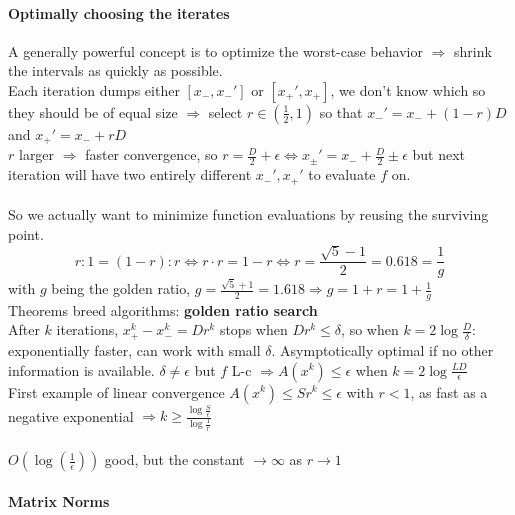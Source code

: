 \documentclass[10pt]{report}
\begin{document}
\paragraph{Optimally choosing the iterates} A generally powerful concept is to optimize the worst-case behavior $\Rightarrow$ shrink the intervals as quickly as possible.\\
Each iteration dumps either $[x_-, x_-']$ or $[x_+', x_+]$, we don't know which so they should be of equal size $\Rightarrow$ select $r\in (\frac{1}{2},1)$ so that $x_-' = x_- + (1-r)D$ and $x_+' = x_- + rD$\\
$r$ larger $\Rightarrow$ faster convergence, so $r = \frac{D}{2} + \epsilon \Leftrightarrow x_\pm' = x_- + \frac{D}{2}\pm\epsilon$ but next iteration will have two entirely different $x_-', x_+'$ to evaluate $f$ on.\\\\
So we actually want to minimize function evaluations by reusing the surviving point. $$r : 1 = (1 - r) : r \Leftrightarrow r\cdot r = 1 - r \Leftrightarrow r = \frac{\sqrt{5} - 1}{2} = 0.618 = \frac{1}{g}$$ with $g$ being the golden ratio, $g = \frac{\sqrt{5} + 1}{2} = 1.618 \Rightarrow g = 1 + r = 1 + \frac{1}{g}$\\
Theorems breed algorithms: \textbf{golden ratio search}\\
After $k$ iterations, $x_+^k - x_-^k = Dr^k$ stops when $Dr^k \leq \delta$, so when $k = 2\log\frac{D}{\delta}$: exponentially faster, can work with small $\delta$. Asymptotically optimal if no other information is available. $\delta \neq \epsilon$ but $f$ L-c $\Rightarrow A(x^k) \leq \epsilon$ when $k = 2\log\frac{LD}{\epsilon}$\\
First example of linear convergence $A(x^k) \leq Sr^k \leq \epsilon$ with $r < 1$, as fast as a negative exponential $\Rightarrow k \geq \frac{\log\frac{S}{\epsilon}}{\log\frac{1}{r}}$\\\\
$O(\log(\frac{1}{\epsilon}))$ good, but the constant $\rightarrow\infty$ as $r\rightarrow 1$

\paragraph{Matrix Norms} %
\end{document}
